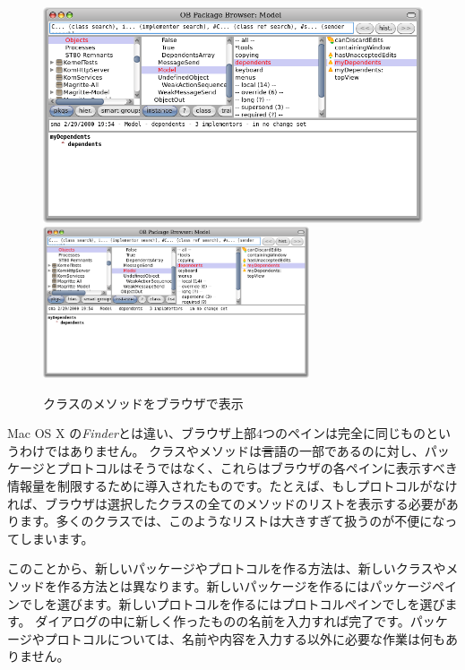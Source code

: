 \documentclass[a4paper,10pt,twoside]{book}
\begin{document}
\begin{figure}[htbp]
   \centering
   \ifluluelse
{\includegraphics[width=\textwidth]{SystemBrowserMyDependents}}
{\includegraphics[width=0.7\textwidth]{SystemBrowserMyDependents}}
   \caption{クラスのメソッドをブラウザで表示
   }
\end{figure}

Mac OS X の\emph{Finder}とは違い、ブラウザ上部4つのペインは完全に同じものというわけではありません。
クラスやメソッドは\st 言語の一部であるのに対し、パッケージとプロトコルはそうではなく、これらはブラウザの各ペインに表示すべき情報量を制限するために導入されたものです。たとえば、もしプロトコルがなければ、ブラウザは選択したクラスの全てのメソッドのリストを表示する必要があります。多くのクラスでは、このようなリストは大きすぎて扱うのが不便になってしまいます。

このことから、新しいパッケージやプロトコルを作る方法は、新しいクラスやメソッドを作る方法とは異なります。新しいパッケージを作るにはパッケージペインで\actclick しを選びます。新しいプロトコルを作るにはプロトコルペインで\actclick しを選びます。
ダイアログの中に新しく作ったものの名前を入力すれば完了です。パッケージやプロトコルについては、名前や内容を入力する以外に必要な作業は何もありません。
\end{document}

